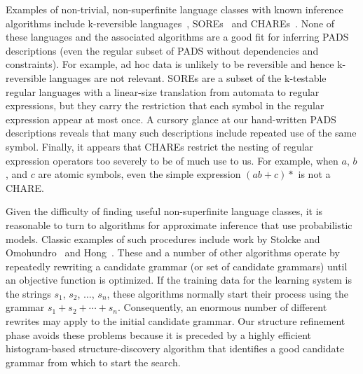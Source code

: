 Examples of non-trivial, non-superfinite
language classes with known inference algorithms include
k-reversible languages~\cite{angluin:revesible-language-inference},
SOREs~\cite{bex+:dtd-inference} and CHAREs~\cite{bex+:dtd-inference}.
None of these languages and the associated algorithms 
are a good fit for inferring PADS descriptions (even the
regular subset of PADS without dependencies and constraints).  
For example, ad hoc data is unlikely to be reversible and hence
k-reversible languages are not relevant.  
SOREs are a subset of the k-testable
regular languages with a linear-size translation from automata to
regular expressions, but they carry the restriction that each symbol
in the regular expression appear at most once.  A cursory glance at
our hand-written PADS descriptions reveals that many such descriptions
include repeated use of the same symbol.  Finally, it appears that
CHAREs restrict the nesting of regular expression operators too severely to 
be of much use to us.  For example, when $a$, $b$, and $c$ are atomic symbols,
even the simple expression $(ab + c)*$ is not a CHARE.

Given the difficulty of finding useful non-superfinite language classes,
it is reasonable to turn to algorithms for approximate
inference that use probabilistic models.    
Classic examples of such procedures include work by Stolcke and
Omohundro~\cite{stolcke94inducing} 
and 
Hong~\cite{hong:thesis,hong01using}.  These and a number of other algorithms
operate by repeatedly rewriting a candidate grammar (or set of candidate
grammars) until an objective function is optimized.
If the training data for the learning system is the strings
$s_1$, $s_2$, $\ldots$, $s_n$, these algorithms normally start their
process using the grammar $s_1 + s_2 + \cdots + s_n$.  Consequently,  
an enormous number of different rewrites may apply to the
initial candidate grammar.  Our structure refinement
phase avoids these problems 
because it is preceded by a highly efficient
histogram-based structure-discovery algorithm 
that identifies a good candidate grammar from which to start the search.  

